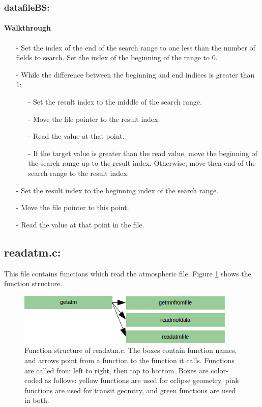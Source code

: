 \documentclass[letterpaper,12pt]{article}
\begin{document}
\subsubsection{datafileBS:}
\paragraph{Walkthrough}
\begin{enumerate}[leftmargin=10pt, noitemsep, parsep=0pt, topsep=0ex]
\item[-] Set the index of the end of the search range to one less than the number of fields to search. Set the index of the beginning of the range to 0.
\item[-] While the difference between the beginning and end indices is greater than 1:
\begin{enumerate}[leftmargin=10pt, noitemsep, parsep=0pt, topsep=0ex]
\item[-] Set the result index to the middle of the search range.
\item[-] Move the file pointer to the result index.
\item[-] Read the value at that point.
\item[-] If the target value is greater than the read value, move the beginning of the search range up to the result index. Otherwise, move then end of the search range to the result index.
\end{enumerate}
\item[-] Set the result index to the beginning index of the search range.
\item[-] Move the file pointer to this point.
\item[-] Read the value at that point in the file. 
\end{enumerate}

\newpage
\subsection{readatm.c:}
This file contains functions which read the atmospheric file. Figure \ref{fig:readatmc} shows the function structure.

\begin{figure}
\includegraphics{fig/readatmc}
\caption{Function structure of readatm.c. The boxes contain function names, and arrows point from a function to the function it calls. Functions are called from left to right, then top to bottom.  Boxes are color-coded as follows:  yellow functions are used for eclipse geometry, pink functions are used for transit geomtry, and green functions are used in both.}
\label{fig:readatmc}
\end{figure}
\end{document}
